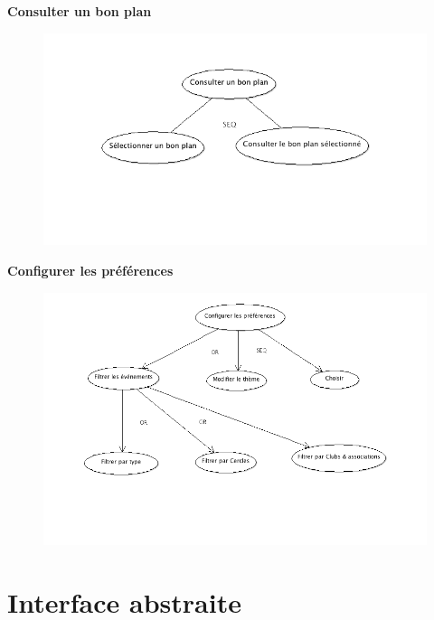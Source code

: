 \documentclass[a4paper, 11pt]{article}
\begin{document}
\textbf{Consulter un bon plan}

\begin{figure}[h!]
\includegraphics[width=18cm]{consulter_bonplans.png}
\end{figure}
\vfill
\clearpage

\textbf{Configurer les préférences}
\begin{figure}[h]
\centering
\includegraphics[width = \textwidth]{configurer_preferences.png}
\end{figure}

\vfill
\clearpage
\section{Interface abstraite}
\label{abstr}
\end{document}
